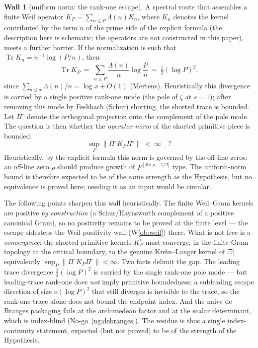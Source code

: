 \documentclass[11pt]{amsart}
\theoremstyle{definition}
\theoremstyle{remark}
\theoremstyle{definition}
\newtheorem{obstruction}{Wall}[section]
\renewcommand{\Re}{\operatorname{Re}}
\DeclareMathOperator{\Tr}{Tr}
\begin{document}
\begin{obstruction}[uniform norm: the rank-one escape]\label{ob:uniform}
A spectral route that assembles a finite Weil operator $K_P=\sum_{n\le P}\Lambda(n)K_n$, where $K_n$
denotes the kernel contributed by the term $n$ of the prime side of the explicit formula (the description
here is schematic; the operators are not constructed in this paper), meets a further barrier. If the
normalization is such that $\Tr K_n=n^{-1}\log(P/n)$, then
\[
   \Tr K_P\ =\ \sum_{n\le P}\frac{\Lambda(n)}{n}\log\frac Pn\ \sim\ \tfrac12(\log P)^2,
\]
since $\sum_{n\le x}\Lambda(n)/n=\log x+O(1)$ (Mertens). Heuristically this divergence is carried by a
single positive rank-one mode (the pole of $\zeta$ at $s=1$); after removing this mode by Feshbach (Schur) shorting, the shorted trace is
bounded. Let $\Pi^\circ$ denote the orthogonal projection onto the complement of the pole mode. The
question is then whether the \emph{operator norm} of the shorted primitive piece is bounded:
\[
   \sup_P\bigl\|\Pi^\circ K_P\Pi^\circ\bigr\|\ <\ \infty\quad\text{?}
\]
Heuristically, by the explicit formula this norm is governed by the off-line zeros: an off-line zero
$\rho$ should produce growth of $P^{\,|\Re\rho-1/2|}$ type. The uniform-norm bound is therefore expected
to be of the same strength as the Hypothesis, but no equivalence is proved here; needing it as an input
would be circular.

The following points sharpen this wall heuristically. The finite Weil--Gram kernels are
positive \emph{by construction} (a Schur/Haynsworth complement of a positive canonical Gram), so no
positivity remains to be proved at the finite level --- the escape sidesteps the Weil-positivity wall
(W\ref{ob:weil}) there. What is not free is a \emph{convergence}: the shorted primitive kernels
$K_P^\circ$ must converge, in the finite-Gram topology at the critical boundary, to the genuine
Kre\u{\i}n--Langer kernel of $\Xi$; equivalently $\sup_P\|\Pi^\circ K_P\Pi^\circ\|<\infty$. Two facts
delimit the gap. The leading trace divergence $\tfrac12(\log P)^2$ is carried by the single rank-one pole
mode --- but leading-trace rank-one does \emph{not} imply primitive boundedness: a subleading escape
direction of size $o(\log P)^2$ that still diverges is invisible to the trace, so the rank-one trace alone
does not bound the endpoint index. And the naive de Branges packaging fails at the archimedean factor and
at the scalar determinant, which is index-blind (No-go~\ref{ng:debranges}). The residue is thus a single
index-continuity statement, expected (but not proved) to be of the strength of the Hypothesis.


\end{obstruction}
\end{document}
